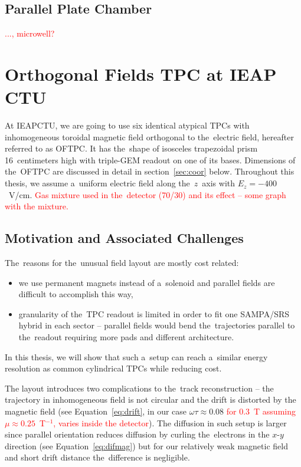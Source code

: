 		\subsection{Parallel Plate Chamber}
			\textcolor{red}{..., microwell?}
			
			
	
	\section{Orthogonal Fields TPC at IEAP CTU}
	\label{sec:oftpc}
		At \ac{IEAPCTU}, we are going to use six identical atypical \ac{TPC}s with inhomogeneous toroidal magnetic field orthogonal to the~electric field, hereafter referred to as \acf{OFTPC}. It has the~shape of isosceles trapezoidal prism 16~centimeters high with triple\nobreakdash-\ac{GEM} readout on one of its bases. Dimensions of the~\ac{OFTPC} are discussed in detail in section~\ref{sec:coor} below. Throughout this thesis, we assume a~uniform electric field along the~$z$~axis with $E_z = -400$~V/cm. \textcolor{red}{Gas mixture used in the~detector (70/30) and its effect -- some graph with the mixture.}
		
		
		\subsection{Motivation and Associated Challenges}
			The~reasons for the~unusual field layout are mostly cost related:
				\begin{itemize}[nosep]
					\item we use permanent magnets instead of a~solenoid and parallel fields are difficult to accomplish this way,
					\item granularity of the~\ac{TPC} readout is limited in order to fit one SAMPA/SRS hybrid in each sector -- parallel fields would bend the~trajectories parallel to the~readout requiring more pads and different architecture.
				\end{itemize}
			In this thesis, we will show that such a~setup can reach a~similar energy resolution as common cylindrical \ac{TPC}s while reducing cost.
			
			The layout introduces two complications to the~track reconstruction -- the trajectory in inhomogeneous field is not circular and the drift is distorted by the magnetic field (see Equation~\ref{eq:drift}, in our case $\omega\tau \approx 0.08$ \textcolor{red}{for 0.3~T assuming $\mu\approx0.25$~T$^{-1}$, varies inside the detector}). The diffusion in such setup is larger since parallel orientation reduces diffusion by curling the~electrons in the $x$\nobreakdash-$y$ direction (see Equation~\ref{eq:difmag}) but for our relatively weak magnetic field and short drift distance the~difference is negligible.
	
